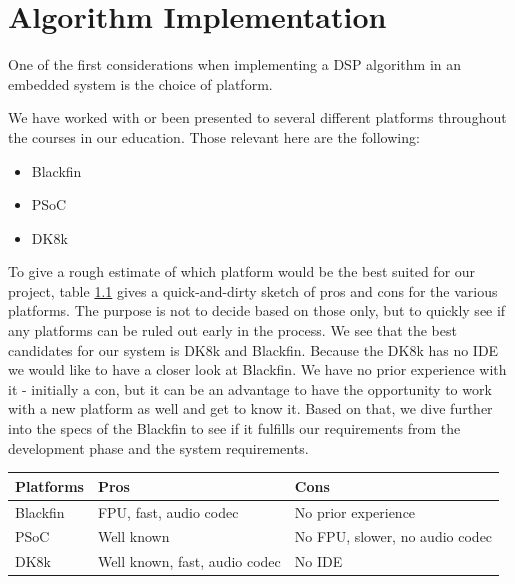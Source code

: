 \chapter{Algorithm Implementation}
One of the first considerations when implementing a DSP algorithm in an embedded system is the choice of platform. 

We have worked with or been presented to several different platforms throughout the courses in our education. Those relevant here are the following:

\begin{itemize}
\item Blackfin
\item PSoC
\item DK8k
\end{itemize}

To give a rough estimate of which platform would be the best suited for our project, table \ref{tab:proscons} gives a quick-and-dirty sketch of pros and cons for the various platforms. The purpose is not to decide based on those only, but to quickly see if any platforms can be ruled out early in the process.
We see that the best candidates for our system is DK8k and Blackfin. Because the DK8k has no IDE we would like to have a closer look at Blackfin. We have no prior experience with it - initially a con, but it can be an advantage to have the opportunity to work with a new platform as well and get to know it.
Based on that, we dive further into the specs of the Blackfin to see if it fulfills our requirements from the development phase and the system requirements.

\begin{table}[hbtp]
 \label{tab:proscons}
    \begin{tabular}{l|ll}
    Platforms & Pros                          & Cons                           \\ \hline
    Blackfin  & FPU, fast, audio codec        & No prior experience            \\
    PSoC      & Well known                   & No FPU, slower, no audio codec \\
    DK8k      & Well known, fast, audio codec & No IDE                         \\
    \end{tabular}
\end{table}



